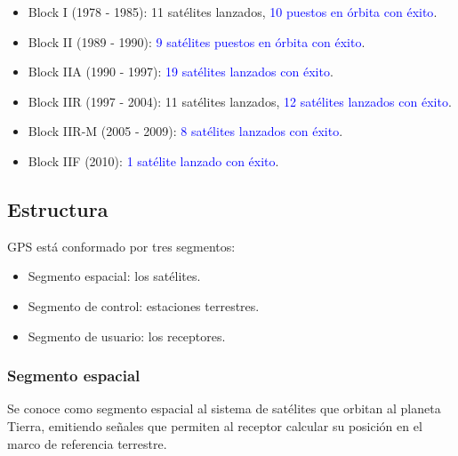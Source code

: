 \begin{itemize}
	\item Block I (1978 - 1985): 11 satélites lanzados, \textcolor{blue}{10 puestos en órbita con éxito}.
	\item Block II (1989 - 1990): \textcolor{blue}{9 satélites puestos en órbita con éxito}.
	\item Block IIA (1990 - 1997): \textcolor{blue}{19 satélites lanzados con éxito}.
	\item Block IIR (1997 - 2004): 11 satélites lanzados, \textcolor{blue}{12 satélites lanzados con éxito}.
	\item Block IIR-M (2005 - 2009): \textcolor{blue}{8 satélites lanzados con éxito}.
	\item Block IIF (2010): \textcolor{blue}{1 satélite lanzado con éxito}.
\end{itemize}

\subsection{Estructura}

GPS está conformado por tres segmentos:

\begin{itemize}
	\item Segmento espacial: los satélites.
	\item Segmento de control: estaciones terrestres.
	\item Segmento de usuario: los receptores.
\end{itemize}
	
\subsubsection{Segmento espacial}

Se conoce como segmento espacial al sistema de satélites que orbitan al planeta Tierra, emitiendo señales que permiten al receptor calcular su posición en el marco de referencia terrestre. \\

